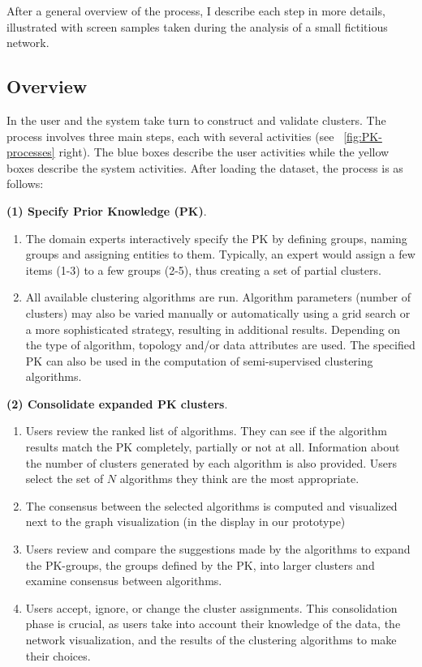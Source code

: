 After a general overview of the process, I describe each step in more details, illustrated with screen samples taken during the analysis of a small fictitious network.

\subsection{Overview}
\label{sec:pk-clustering}

In \pkclustering the user and the system take turn to construct and validate clusters.
The process involves three main steps, each with several activities (see ~\autoref{fig:PK-processes} right).
The blue boxes describe the user activities while the yellow boxes describe the system activities.
After loading the dataset, the process is as follows:

\noindent \textbf{(1) Specify Prior Knowledge (PK)}.
\begin{enumerate}[left=.3em,nosep,label={\arabic*}.]
\item The domain experts interactively specify the PK by defining  groups, \ie naming groups and assigning entities to them.
Typically, an expert would assign a few items (1-3) to a few groups (2-5), thus creating a set of partial clusters.
\item All available clustering algorithms are run. Algorithm parameters (\eg number of clusters) may also be varied manually or automatically using a grid search or a more sophisticated strategy, resulting in additional results. Depending on the type of algorithm, topology and/or data attributes are used. The specified PK can also be used in the computation of semi-supervised clustering algorithms.
\end{enumerate}

\noindent \textbf{(2) Consolidate expanded PK clusters}.
\begin{enumerate}[left=.3em,nosep,label={\arabic*}.,start=3]
\item Users review the ranked list of algorithms. They can see if the algorithm results match the PK completely, partially or not at all. Information about the number of clusters generated by each algorithm is also provided.  Users select the set of $N$ algorithms they think are the most appropriate.
\item The consensus between the selected algorithms is computed and visualized next to the graph visualization  (in the \paovis display in our prototype)
\item Users review and compare the suggestions made by the algorithms to expand the PK-groups, \ie the groups defined by the PK, into larger clusters and examine consensus between algorithms.
\item Users accept, ignore, or change the cluster assignments. This consolidation phase is crucial, as users take into account their knowledge of the data, the network visualization, and the results of the clustering algorithms to make their choices.
\end{enumerate}

